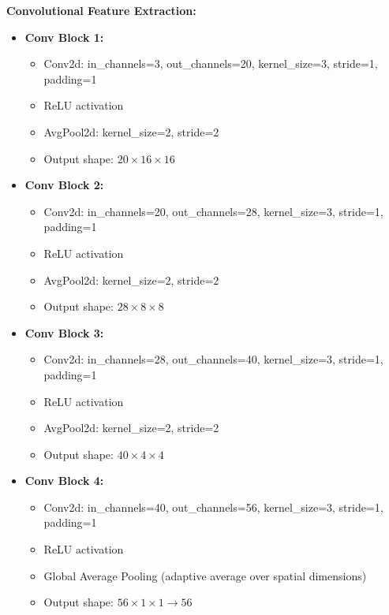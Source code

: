 \documentclass[11pt,a4paper]{article}
\begin{document}
\textbf{Convolutional Feature Extraction:}
\begin{itemize}
    \item \textbf{Conv Block 1:}
    \begin{itemize}
        \item Conv2d: in\_channels=3, out\_channels=20, kernel\_size=3, stride=1, padding=1
        \item ReLU activation
        \item AvgPool2d: kernel\_size=2, stride=2
        \item Output shape: $20 \times 16 \times 16$
    \end{itemize}

    \item \textbf{Conv Block 2:}
    \begin{itemize}
        \item Conv2d: in\_channels=20, out\_channels=28, kernel\_size=3, stride=1, padding=1
        \item ReLU activation
        \item AvgPool2d: kernel\_size=2, stride=2
        \item Output shape: $28 \times 8 \times 8$
    \end{itemize}

    \item \textbf{Conv Block 3:}
    \begin{itemize}
        \item Conv2d: in\_channels=28, out\_channels=40, kernel\_size=3, stride=1, padding=1
        \item ReLU activation
        \item AvgPool2d: kernel\_size=2, stride=2
        \item Output shape: $40 \times 4 \times 4$
    \end{itemize}

    \item \textbf{Conv Block 4:}
    \begin{itemize}
        \item Conv2d: in\_channels=40, out\_channels=56, kernel\_size=3, stride=1, padding=1
        \item ReLU activation
        \item Global Average Pooling (adaptive average over spatial dimensions)
        \item Output shape: $56 \times 1 \times 1 \to 56$
    \end{itemize}
\end{itemize}
\end{document}

